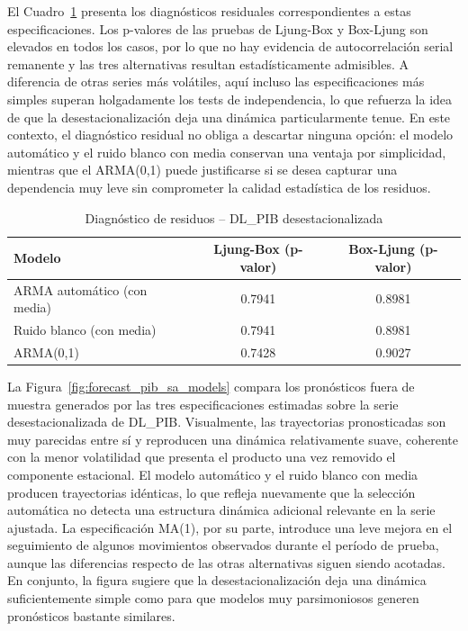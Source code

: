 \documentclass[11pt]{article}
\begin{document}
El Cuadro~\ref{tab:diag_sa_pib} presenta los diagnósticos residuales correspondientes a estas especificaciones. Los p-valores de las pruebas de Ljung-Box y Box-Ljung son elevados en todos los casos, por lo que no hay evidencia de autocorrelación serial remanente y las tres alternativas resultan estadísticamente admisibles. A diferencia de otras series más volátiles, aquí incluso las especificaciones más simples superan holgadamente los tests de independencia, lo que refuerza la idea de que la desestacionalización deja una dinámica particularmente tenue. En este contexto, el diagnóstico residual no obliga a descartar ninguna opción: el modelo automático y el ruido blanco con media conservan una ventaja por simplicidad, mientras que el ARMA(0,1) puede justificarse si se desea capturar una dependencia muy leve sin comprometer la calidad estadística de los residuos.

\begin{table}[H]
\centering
\caption{Diagnóstico de residuos – DL\_PIB desestacionalizada}
\begin{tabular}{lcc}
\hline
Modelo & Ljung-Box (p-valor) & Box-Ljung (p-valor) \\
\hline
ARMA automático (con media) & 0.7941 & 0.8981 \\
Ruido blanco (con media)    & 0.7941 & 0.8981 \\
ARMA(0,1)                   & 0.7428 & 0.9027 \\
\hline
\end{tabular}
\label{tab:diag_sa_pib}
\end{table}

La Figura~\ref{fig:forecast_pib_sa_models} compara los pronósticos fuera de muestra generados por las tres especificaciones estimadas sobre la serie desestacionalizada de DL\_PIB. Visualmente, las trayectorias pronosticadas son muy parecidas entre sí y reproducen una dinámica relativamente suave, coherente con la menor volatilidad que presenta el producto una vez removido el componente estacional. El modelo automático y el ruido blanco con media producen trayectorias idénticas, lo que refleja nuevamente que la selección automática no detecta una estructura dinámica adicional relevante en la serie ajustada. La especificación MA(1), por su parte, introduce una leve mejora en el seguimiento de algunos movimientos observados durante el período de prueba, aunque las diferencias respecto de las otras alternativas siguen siendo acotadas. En conjunto, la figura sugiere que la desestacionalización deja una dinámica suficientemente simple como para que modelos muy parsimoniosos generen pronósticos bastante similares.
\end{document}
